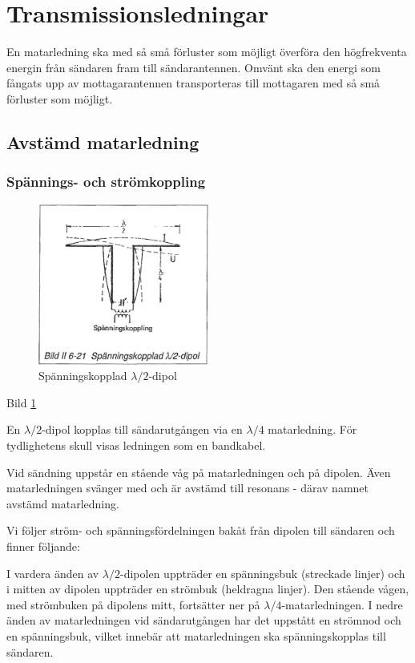 \section{Transmissionsledningar}
\label{transmissionsledningar}

En matarledning ska med så små förluster som möjligt överföra den
högfrekventa energin från sändaren fram till sändarantennen.  Omvänt
ska den energi som fångats upp av mottagarantennen transporteras
till mottagaren med så små förluster som möjligt.

\subsection{Avstämd matarledning}

\subsubsection{Spännings- och strömkoppling}

\begin{figure}
  \includegraphics[width=0.5\textwidth]{images/bild_2_6-21}
  \caption{Spänningskopplad \(\lambda/2\)-dipol}
  \label{fig:bildII6-21}
\end{figure}

Bild \ref{fig:bildII6-21}

En \(\lambda/2\)-dipol kopplas till sändarutgången via en
\(\lambda/4\) matarledning. För tydlighetens skull visas ledningen som
en bandkabel.

Vid sändning uppstår en stående våg på matarledningen och på
dipolen. Även matarledningen svänger med och är avstämd till resonans
- därav namnet avstämd matarledning.

Vi följer ström- och spänningsfördelningen bakåt från dipolen till
sändaren och finner följande:

I vardera änden av \(\lambda/2\)-dipolen uppträder en spänningsbuk
(streckade linjer) och i mitten av dipolen uppträder en strömbuk
(heldragna linjer). Den stående vågen, med strömbuken på dipolens
mitt, fortsätter ner på \(\lambda/4\)-matarledningen. I nedre änden av
matarledningen vid sändarutgången har det uppstått en strömnod och en
spänningsbuk, vilket innebär att matarledningen ska spänningskopplas
till sändaren.

